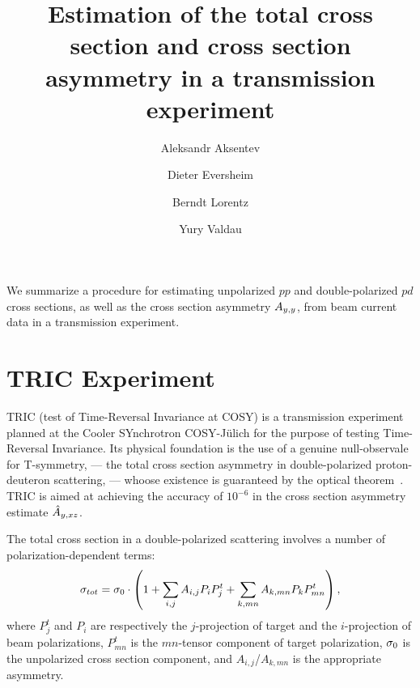 \documentclass[reprint, superscriptaddress]{revtex4-1}
\begin{document}
\title{Estimation of the total cross section and cross section asymmetry in a transmission experiment}
\author{Aleksandr Aksentev}
\author{Dieter Eversheim}
\author{Berndt Lorentz}
\author{Yury Valdau}

\maketitle

\captionsetup[figure]{labelfont=bf,textfont=normalfont,singlelinecheck=off,justification=raggedright}

	
	
\begin{abstractname}
We summarize a procedure for estimating unpolarized $pp$ and double-polarized $pd$ cross sections, as well as the cross section asymmetry $\Ayy$, from beam current data in a transmission experiment.
\end{abstractname}

\section{TRIC Experiment}

TRIC (test of Time-Reversal Invariance at COSY) is a transmission experiment planned at the Cooler SYnchrotron COSY-J\"ulich for the purpose of testing Time-Reversal Invariance. Its physical foundation is the use of a genuine null-observale for T-symmetry, --- the total cross section asymmetry in double-polarized proton-deuteron scattering, --- whoose existence is guaranteed by the optical theorem~\cite{Conzett}. TRIC is aimed at achieving the accuracy of $10^{-6}$ in the cross section asymmetry estimate $\Ayxz*$.

The total cross section in a double-polarized scattering involves a number of polarization-dependent terms:
\begin{equation}\label{eq:PolCS}
	\CS[tot] = \CS[0]\cdot\bkt{1 + \sum_{i,j} A_{i,j} P_iP^t_j + \sum_{k, mn} A_{k,mn}P_k P^t_{mn}},
\end{equation}
where $P^t_j$ and $P_i$ are respectively the $j$-projection of target and the $i$-projection of beam polarizations, $P^t_{mn}$ is the $mn$-tensor component of target polarization, $\CS[0]$ is the unpolarized cross section component, and $A_{i,j}$/$A_{k,mn}$ is the appropriate asymmetry.
\end{document}

